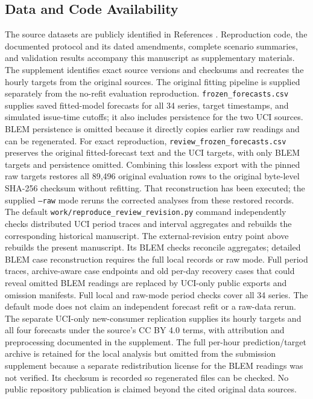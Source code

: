 \documentclass[12pt]{article}
\begin{document}
\subsection*{Data and Code Availability}
The source datasets are publicly identified in References
\cite{uci,portugal,blem,lcl}. Reproduction code, the documented protocol and its
dated amendments, complete scenario summaries, and
validation results accompany this manuscript as supplementary materials.
The supplement identifies exact source versions and checksums and recreates
the hourly targets from the original sources. The original fitting pipeline
is supplied separately from the no-refit evaluation reproduction.
\texttt{frozen\_forecasts.csv} supplies saved fitted-model forecasts for all
34 series, target timestamps, and simulated issue-time cutoffs; it also
includes persistence for the two UCI sources. BLEM persistence is omitted
because it directly copies earlier raw readings and can be regenerated.
For exact reproduction, \texttt{review\_frozen\_forecasts.csv} preserves
the original fitted-forecast text and the UCI targets, with only BLEM
targets and persistence omitted. Combining this lossless export with the
pinned raw targets restores all 89,496 original evaluation rows to the
original byte-level SHA-256 checksum without refitting. That reconstruction
has been executed; the supplied \texttt{--raw} mode reruns the corrected
analyses from these restored records. The default
\texttt{work/reproduce\_review\_revision.py} command independently checks
distributed UCI period traces and interval aggregates and rebuilds the
corresponding historical manuscript. The external-revision entry point above
rebuilds the present manuscript. Its BLEM checks reconcile aggregates; detailed BLEM case
reconstruction requires the full local records or raw mode. Full period
traces, archive-aware case endpoints and old per-day recovery cases that
could reveal omitted BLEM readings are replaced by UCI-only public exports
and omission manifests. Full local and raw-mode period checks cover all
34 series. The default mode does not claim an independent forecast refit
or a raw-data rerun.
The separate UCI-only new-consumer replication supplies its hourly targets
and all four forecasts under the source's CC BY 4.0 terms, with attribution
and preprocessing documented in the supplement.
The full
per-hour prediction/target archive is retained for the local analysis but
omitted from the submission supplement because a separate redistribution
license for the BLEM readings was not verified. Its checksum is recorded
so regenerated files can be checked. No public
repository publication is claimed beyond the cited original data sources.
\end{document}
